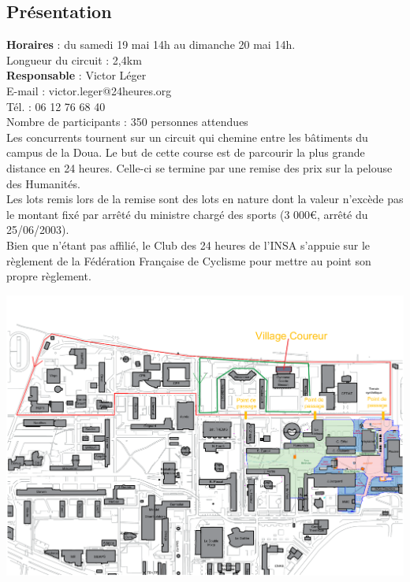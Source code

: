 \documentclass[hidelinks, paper=a4, fontsize=13pt]{report}
\begin{document}
\subsection{Présentation}

\textbf{Horaires} : du samedi 19 mai 14h au dimanche 20 mai 14h.\\

Longueur du circuit : 2,4km \\

\textbf{Responsable} : Victor Léger\\
	E-mail : victor.leger@24heures.org\\
	Tél. : 06 12 76 68 40\\

Nombre de participants : 350 personnes attendues\\

Les concurrents tournent sur un circuit qui chemine entre les bâtiments du campus de la Doua. Le but de cette course est de parcourir la plus grande distance en 24 heures. Celle-ci se termine par une remise des prix sur la pelouse des Humanités.\\
Les lots remis lors de la remise sont des lots en nature dont la valeur n'excède pas le montant fixé par arrêté du ministre chargé des sports (3 000\euro{}, arrêté du 25/06/2003).\\
Bien que n’étant pas affilié, le Club des 24 heures de l'INSA s’appuie sur le règlement de la Fédération Française de Cyclisme pour mettre au point son propre règlement.

\begin{center}
\includegraphics[width=\textwidth,keepaspectratio,angle=90]{Exports/Plan_24h_44eme-Parcours_courses}
\end{center}
\end{document}
